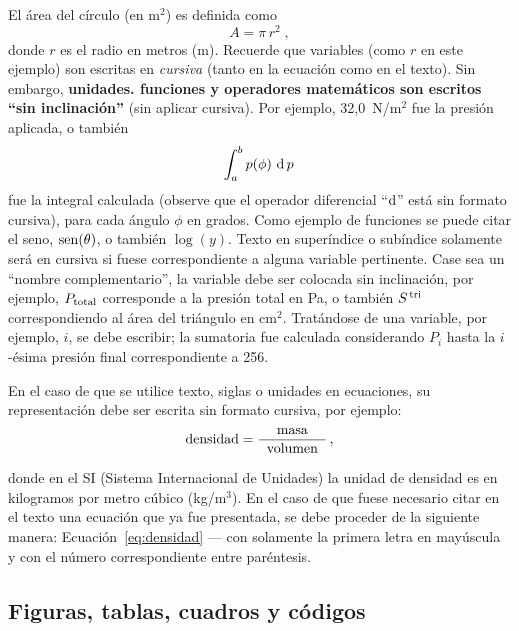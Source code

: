 \documentclass[12pt, a4paper, twoside, twocolumn]{article}
\begin{document}
El área del círculo (en m$^2$) es definida como
%
\begin{equation}
	A = \pi \, r^2\;,
\label{eq:area-circ}
\end{equation}
%
donde $r$ es el radio en metros (m). Recuerde que variables (como $r$ en este ejemplo) son escritas en \textit{cursiva} (tanto en la ecuación como en el texto). Sin embargo, \textbf{unidades. funciones y operadores matemáticos son escritos ``sin inclinación''} (sin aplicar cursiva). Por ejemplo, 32,0~N/m$^2$ fue la presión aplicada, o también
%
\begin{equation}
	\int_a^b p(\phi)\, \operatorname{d} p\,
\label{eq:int}
\end{equation}
%
fue la integral calculada (observe que el operador diferencial ``$\text{d}$''  está sin formato cursiva), para cada ángulo $\phi$ en grados. Como ejemplo de funciones se puede citar el seno, $\operatorname{sen}(\theta)$, o también $\log(y)$.
%
Texto en superíndice o subíndice solamente será en cursiva si fuese correspondiente a alguna variable pertinente. Case sea un ``nombre complementario'', la variable debe ser colocada sin inclinación, por ejemplo, $P_{\text{total}}$ corresponde a la presión total en Pa, o también $S^{\text{\,tri}}$ correspondiendo al área del triángulo en cm$^2$. Tratándose de una variable, por ejemplo, $i$, se debe escribir; la sumatoria fue calculada considerando $P_i$ hasta la $i$-ésima presión final correspondiente a 256.

En el caso de que se utilice texto, siglas o unidades en ecuaciones, su representación debe ser escrita sin formato cursiva, por ejemplo:
%
\begin{equation}
	\text{densidad} = \frac{\text{masa}}{\;\;\text{volumen}\;\;}\,,
\label{eq:densidad}
\end{equation}

donde en el SI (Sistema Internacional de Unidades) la unidad de densidad es en kilogramos por metro cúbico (kg/m$^3$).
%
En el caso de que fuese necesario citar en el texto una ecuación que ya fue presentada, se debe proceder de la siguiente manera: Ecuación~\eqref{eq:densidad} --- con solamente la primera letra en mayúscula y con el número correspondiente entre paréntesis.

\subsection{Figuras, tablas, cuadros y códigos}
\end{document}
